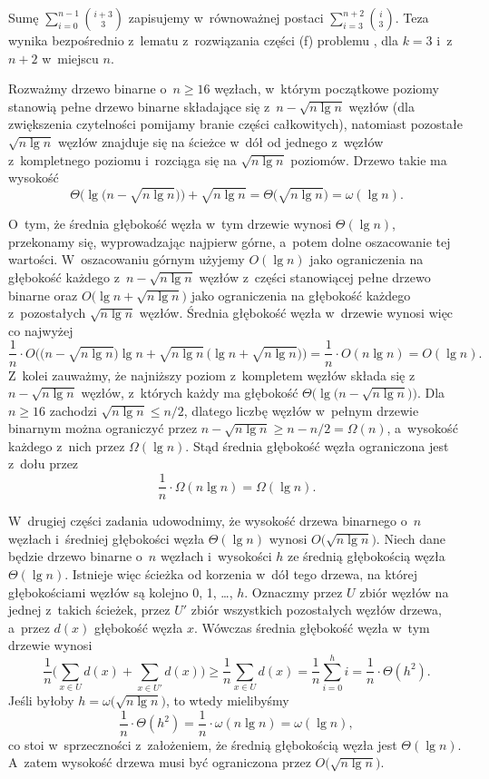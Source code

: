 
\exercise %
Sumę $\sum_{i=0}^{n-1}\binom{i+3}{3}$ zapisujemy w~równoważnej postaci $\sum_{i=3}^{n+2}\binom{i}{3}$.
Teza wynika bezpośrednio z~lematu z~rozwiązania części (f) problemu , dla $k=3$ i~z~$n+2$ w~miejscu $n$.

\exercise %
Rozważmy drzewo binarne o~$n\ge16$ węzłach, w~którym początkowe poziomy stanowią pełne drzewo binarne składające się z~$n-\sqrt{n\lg n}$ węzłów (dla zwiększenia czytelności pomijamy branie części całkowitych), natomiast pozostałe $\sqrt{n\lg n}$ węzłów znajduje się na ścieżce w~dół od jednego z~węzłów z~kompletnego poziomu i~rozciąga się na $\sqrt{n\lg n}$ poziomów.
Drzewo takie ma wysokość
\[
	\Theta\bigl(\lg\bigl(n-\sqrt{n\lg n}\bigr)\bigr)+\sqrt{n\lg n} = \Theta\bigl(\!\sqrt{n\lg n}\bigr) = \omega(\lg n).
\]

O~tym, że średnia głębokość węzła w~tym drzewie wynosi $\Theta(\lg n)$, przekonamy się, wyprowadzając najpierw górne, a~potem dolne oszacowanie tej wartości.
W~oszacowaniu górnym użyjemy $O(\lg n)$ jako ograniczenia na głębokość każdego z~$n-\sqrt{n\lg n}$ węzłów z~części stanowiącej pełne drzewo binarne oraz $O\bigl(\lg n+\sqrt{n\lg n}\bigr)$ jako ograniczenia na głębokość każdego z~pozostałych $\sqrt{n\lg n}$ węzłów.
Średnia głębokość węzła w~drzewie wynosi więc co najwyżej
\[
	\frac{1}{n}\cdot O\bigl(\bigl(n-\sqrt{n\lg n}\bigr)\lg n+\sqrt{n\lg n}\,\bigl(\lg n+\sqrt{n\lg n}\bigr)\bigr) = \frac{1}{n}\cdot O(n\lg n) = O(\lg n).
\]
Z~kolei zauważmy, że najniższy poziom z~kompletem węzłów składa się z~$n-\sqrt{n\lg n}$ węzłów, z~których każdy ma głębokość $\Theta\bigl(\lg\bigl(n-\sqrt{n\lg n}\bigr)\bigr)$.
Dla $n\ge16$ zachodzi $\sqrt{n\lg n}\le n/2$, dlatego liczbę węzłów w~pełnym drzewie binarnym można ograniczyć przez $n-\sqrt{n\lg n}\ge n-n/2=\Omega(n)$, a~wysokość każdego z~nich przez $\Omega(\lg n)$.
Stąd średnia głębokość węzła ograniczona jest z~dołu przez
\[
	\frac{1}{n}\cdot\Omega(n\lg n) = \Omega(\lg n).
\]

W~drugiej części zadania udowodnimy, że wysokość drzewa binarnego o~$n$ węzłach i~średniej głębokości węzła $\Theta(\lg n)$ wynosi $O\bigl(\!\sqrt{n\lg n}\bigr)$.
Niech dane będzie drzewo binarne o~$n$ węzłach i~wysokości $h$ ze średnią głębokością węzła $\Theta(\lg n)$.
Istnieje więc ścieżka od korzenia w~dół tego drzewa, na której głębokościami węzłów są kolejno 0, 1, \dots, $h$.
Oznaczmy przez $U$ zbiór węzłów na jednej z~takich ścieżek, przez $U'$ zbiór wszystkich pozostałych węzłów drzewa, a~przez $d(x)$ głębokość węzła $x$.
Wówczas średnia głębokość węzła w~tym drzewie wynosi
\[
	\frac{1}{n}\biggl(\sum_{x\in U}d(x)+\sum_{x\in U'}d(x)\biggr) \ge \frac{1}{n}\sum_{x\in U}d(x) = \frac{1}{n}\sum_{i=0}^hi = \frac{1}{n}\cdot\Theta(h^2).
\]
Jeśli byłoby $h=\omega\bigl(\!\sqrt{n\lg n}\bigr)$, to wtedy mielibyśmy
\[
	\frac{1}{n}\cdot\Theta(h^2) = \frac{1}{n}\cdot\omega(n\lg n) = \omega(\lg n),
\]
co stoi w~sprzeczności z~założeniem, że średnią głębokością węzła jest $\Theta(\lg n)$.
A~zatem wysokość drzewa musi być ograniczona przez $O\bigl(\!\sqrt{n\lg n}\bigr)$.

